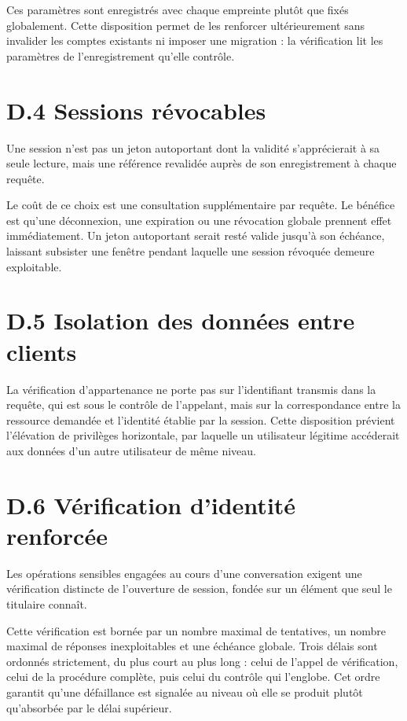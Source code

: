 Ces paramètres sont enregistrés avec chaque empreinte plutôt que fixés globalement. Cette disposition permet de les renforcer ultérieurement sans invalider les comptes existants ni imposer une migration : la vérification lit les paramètres de l'enregistrement qu'elle contrôle.

\section*{D.4 Sessions révocables}

Une session n'est pas un jeton autoportant dont la validité s'apprécierait à sa seule lecture, mais une référence revalidée auprès de son enregistrement à chaque requête.

Le coût de ce choix est une consultation supplémentaire par requête. Le bénéfice est qu'une déconnexion, une expiration ou une révocation globale prennent effet immédiatement. Un jeton autoportant serait resté valide jusqu'à son échéance, laissant subsister une fenêtre pendant laquelle une session révoquée demeure exploitable.

\section*{D.5 Isolation des données entre clients}

La vérification d'appartenance ne porte pas sur l'identifiant transmis dans la requête, qui est sous le contrôle de l'appelant, mais sur la correspondance entre la ressource demandée et l'identité établie par la session. Cette disposition prévient l'élévation de privilèges horizontale, par laquelle un utilisateur légitime accéderait aux données d'un autre utilisateur de même niveau.

\section*{D.6 Vérification d'identité renforcée}

Les opérations sensibles engagées au cours d'une conversation exigent une vérification distincte de l'ouverture de session, fondée sur un élément que seul le titulaire connaît.

Cette vérification est bornée par un nombre maximal de tentatives, un nombre maximal de réponses inexploitables et une échéance globale. Trois délais sont ordonnés strictement, du plus court au plus long : celui de l'appel de vérification, celui de la procédure complète, puis celui du contrôle qui l'englobe. Cet ordre garantit qu'une défaillance est signalée au niveau où elle se produit plutôt qu'absorbée par le délai supérieur.

